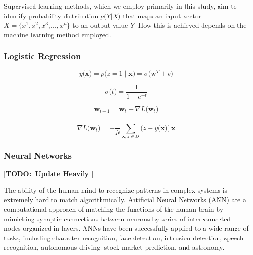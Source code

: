 \documentclass{article}
\newcommand{\todo}[1]{ {\color{red}[{\bf TODO:~{#1}}]} }
\renewcommand{\vec}[1]{\mathbf{#1}}
\begin{document}
Supervised learning methods, which we employ primarily in this study, aim to identify probability distribution \(p \big(Y |  X \big)\) that maps an input vector \(X = \big\{x^1, x^2, x^3, ..., x^n\big\}\) to an output value \(Y\). How this is achieved depends on the machine learning method employed. 

\subsubsection{\label{sec:level3}Logistic Regression}

\begin{equation}
    y \big( \vec{x} \big) = p \big(z=1 \mid  \vec{x} \big) =  \sigma  \big( \vec{w}^{T}+b \big) 
\end{equation}

\begin{equation}
    \sigma  \big(t\big) = \frac{1}{1+e^{-t}}
\end{equation} 

\begin{equation}
    \vec{w}_{t+1} = \vec{w}_{t} -  \nabla L \big(\vec{w}_{t}\big) 
\end{equation}


\begin{equation}
\nabla L \big(\vec{w}_{t}\big) =  -\frac{1}{N}  \sum_{ \vec{x}, z \in D } \big(z-y \big( \vec{x} \big) \big)\ \vec{x}
\end{equation}

\subsubsection{\label{sec:level3}Neural Networks}

\todo{Update Heavily }

The ability of the human mind to recognize patterns in complex systems is extremely hard to match algorithmically. Artificial Neural Networks (ANN) are a computational approach of matching the functions of the human brain by mimicking synaptic connections between neurons by series of interconnected nodes organized in layers. ANNs have been successfully applied to a wide range of tasks, including character recognition, face detection, intrusion detection, speech recognition, autonomous driving, stock market prediction, and astronomy. 
\end{document}
